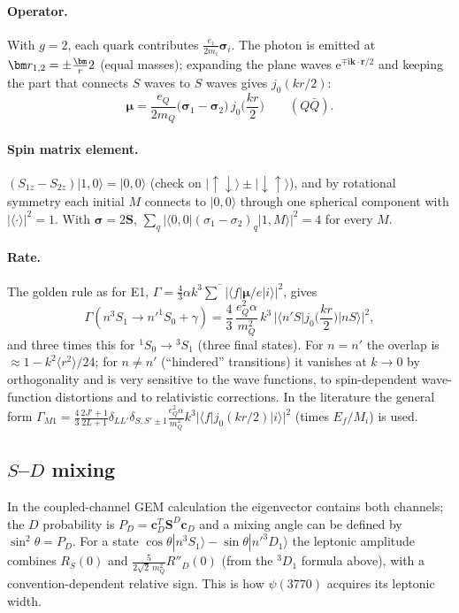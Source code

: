 \documentclass[11pt,a4paper]{article}
\numberwithin{equation}{section}
\theoremstyle{definition}
\theoremstyle{plain}
\theoremstyle{remark}
\numberwithin{algorithm}{section}
\newcommand{\vr}{\bm r}
\newcommand{\vS}{\bm S}
\newcommand{\vsig}{\bm\sigma}
\newcommand{\ii}{\mathrm{i}}
\newcommand{\ee}{\mathrm{e}}
\newcommand{\ket}[1]{|#1\rangle}
\newcommand{\mS}{\mathbf S}
\newcommand{\vc}{\bm c}
\begin{document}
\paragraph{Operator.} With $g=2$, each quark contributes $\frac{e_i}{2m_i}\vsig_i$. The photon is emitted at $\vr_{1,2}=\pm\frac\vr2$ (equal masses); expanding the plane waves $\ee^{\mp\ii\bm k\cdot\vr/2}$ and keeping the part that connects $S$ waves to $S$ waves gives $j_0(kr/2)$:
\begin{equation}
\bm\mu=\frac{e_Q}{2m_Q}\big(\vsig_1-\vsig_2\big)\,j_0\!\Big(\frac{kr}{2}\Big)\qquad(Q\bar Q).
\end{equation}
\paragraph{Spin matrix element.} $(S_{1z}-S_{2z})\ket{1,0}=\ket{0,0}$ (check on $\ket{\uparrow\downarrow}\pm\ket{\downarrow\uparrow}$), and by rotational symmetry each initial $M$ connects to $\ket{0,0}$ through one spherical component with $|\langle\cdot\rangle|^2=1$. With $\vsig=2\vS$, $\sum_q|\langle0,0|(\sigma_1-\sigma_2)_q|1,M\rangle|^2=4$ for every $M$.
\paragraph{Rate.} The golden rule as for E1, $\Gamma=\frac43\alpha k^3\overline{\sum}|\langle f|\bm\mu/e|i\rangle|^2$, gives
\begin{equation}
\Gamma(n^3S_1\to n'^1S_0+\gamma)=\frac43\,\frac{e_Q^2\alpha}{m_Q^2}\,k^3\,\Big|\Big\langle n'S\Big|j_0\Big(\frac{kr}2\Big)\Big|nS\Big\rangle\Big|^2,
\end{equation}
and three times this for ${}^1S_0\to{}^3S_1$ (three final states). For $n=n'$ the overlap is $\approx1-k^2\langle r^2\rangle/24$; for $n\ne n'$ (``hindered'' transitions) it vanishes at $k\to0$ by orthogonality and is very sensitive to the wave functions, to spin-dependent wave-function distortions and to relativistic corrections. In the literature the general form $\Gamma_{M1}=\frac43\frac{2J'+1}{2L+1}\delta_{LL'}\delta_{S,S'\pm1}\frac{e_Q^2\alpha}{m_Q^2}k^3|\langle f|j_0(kr/2)|i\rangle|^2$ (times $E_f/M_i$) is used.

\subsection{\texorpdfstring{$S$--$D$ mixing}{S-D mixing}}
In the coupled-channel GEM calculation the eigenvector contains both channels; the $D$ probability is $P_D=\vc_D^T\mS^D\vc_D$ and a mixing angle can be defined by $\sin^2\theta=P_D$. For a state $\cos\theta\ket{n^3S_1}-\sin\theta\ket{n'^3D_1}$ the leptonic amplitude combines $R_S(0)$ and $\frac{5}{2\sqrt2\,m_Q^2}R''_D(0)$ (from the ${}^3D_1$ formula above), with a convention-dependent relative sign. This is how $\psi(3770)$ acquires its leptonic width.
\end{document}
